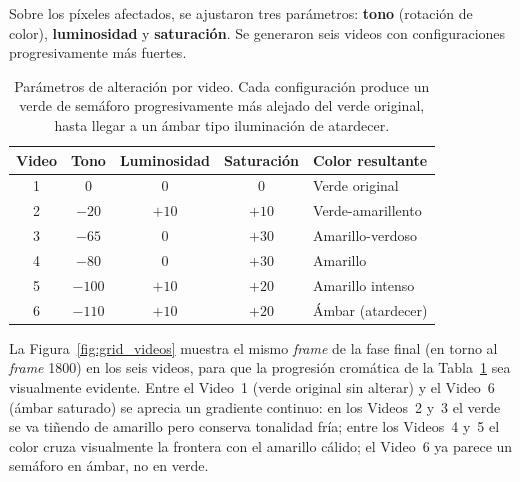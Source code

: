 Sobre los píxeles afectados, se ajustaron tres parámetros: \textbf{tono} (rotación de color), \textbf{luminosidad} y \textbf{saturación}. Se generaron seis videos con configuraciones progresivamente más fuertes.

\begin{table}[H]
\centering
\begin{tabular}{|c|c|c|c|p{4cm}|}
\hline
\textbf{Video} & \textbf{Tono} & \textbf{Luminosidad} & \textbf{Saturación} & \textbf{Color resultante} \\
\hline
1 & 0 & 0 & 0 & Verde original \\
2 & $-20$ & $+10$ & $+10$ & Verde-amarillento \\
3 & $-65$ & 0 & $+30$ & Amarillo-verdoso \\
4 & $-80$ & 0 & $+30$ & Amarillo \\
5 & $-100$ & $+10$ & $+20$ & Amarillo intenso \\
6 & $-110$ & $+10$ & $+20$ & Ámbar (atardecer) \\
\hline
\end{tabular}
\caption{Parámetros de alteración por video. Cada configuración produce un verde de semáforo progresivamente más alejado del verde original, hasta llegar a un ámbar tipo iluminación de atardecer.}
\label{tab:videos_test}
\end{table}

La Figura~\ref{fig:grid_videos} muestra el mismo \textit{frame} de la fase final (en torno al \textit{frame} 1800) en los seis videos, para que la progresión cromática de la Tabla~\ref{tab:videos_test} sea visualmente evidente. Entre el Video~1 (verde original sin alterar) y el Video~6 (ámbar saturado) se aprecia un gradiente continuo: en los Videos~2 y~3 el verde se va tiñendo de amarillo pero conserva tonalidad fría; entre los Videos~4 y~5 el color cruza visualmente la frontera con el amarillo cálido; el Video~6 ya parece un semáforo en ámbar, no en verde.

